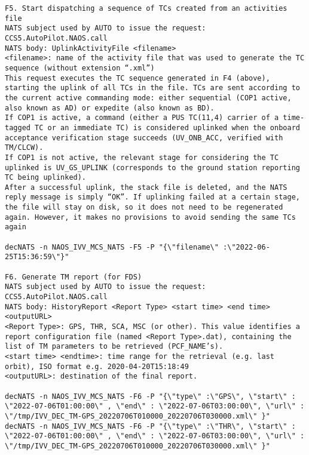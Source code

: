 \documentclass[dec_sum_main.tex]{subfiles}
\begin{document}
\begin{verbatim}
F5. Start dispatching a sequence of TCs created from an activities file
NATS subject used by AUTO to issue the request: CCS5.AutoPilot.NAOS.call
NATS body: UplinkActivityFile <filename>
<filename>: name of the activity file that was used to generate the TC sequence (without extension “.xml”)
This request executes the TC sequence generated in F4 (above), starting the uplink of all TCs in the file. TCs are sent according to the current active commanding mode: either sequential (COP1 active, also known as AD) or expedite (also known as BD).
If COP1 is active, a command (either a PUS TC(11,4) carrier of a time-tagged TC or an immediate TC) is considered uplinked when the onboard acceptance verification stage succeeds (UV_ONB_ACC, verified with TM/CLCW).
If COP1 is not active, the relevant stage for considering the TC uplinked is UV_GS_UPLINK (corresponds to the ground station reporting TC being uplinked).
After a successful uplink, the stack file is deleted, and the NATS reply message is simply “OK”. If uplinking failed at a certain stage, the file will stay on disk, so it does not need to be regenerated again. However, it makes no provisions to avoid sending the same TCs again

decNATS -n NAOS_IVV_MCS_NATS -F5 -P "{\"filename\" :\"2022-06-25T15:36:59\"}"

F6. Generate TM report (for FDS)
NATS subject used by AUTO to issue the request: CCS5.AutoPilot.NAOS.call
NATS body: HistoryReport <Report Type> <start time> <end time> <outputURL>
<Report Type>: GPS, THR, SCA, MSC (or other). This value identifies a report configuration file (named <Report Type>.dat), containing the list of TM parameters to be retrieved (PCF_NAME’s).
<start time> <endtime>: time range for the retrieval (e.g. last orbit), ISO format e.g. 2020-04-20T15:18:49
<outputURL>: destination of the final report.

decNATS -n NAOS_IVV_MCS_NATS -F6 -P "{\"type\" :\"GPS\", \"start\" : \"2022-07-06T01:00:00\" , \"end\" : \"2022-07-06T03:00:00\", \"url\" : \"/tmp/IVV_DEC_TM-GPS_20220706T010000_20220706T030000.xml\" }"
decNATS -n NAOS_IVV_MCS_NATS -F6 -P "{\"type\" :\"THR\", \"start\" : \"2022-07-06T01:00:00\" , \"end\" : \"2022-07-06T03:00:00\", \"url\" : \"/tmp/IVV_DEC_TM-GPS_20220706T010000_20220706T030000.xml\" }"


\end{verbatim}
\end{document}

